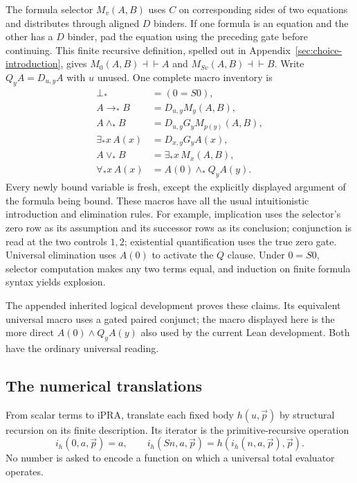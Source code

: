 \documentclass[11pt,letterpaper]{article}
\theoremstyle{definition}\newtheorem{definition}[theorem]{Definition}
\theoremstyle{remark}\newtheorem{remark}[theorem]{Remark}
\begin{document}
The formula selector $M_v(A,B)$ uses $C$ on corresponding sides of two
equations and distributes through aligned $D$ binders. If one formula
is an equation and the other has a $D$ binder, pad the equation using
the preceding gate before continuing. This finite recursive definition,
spelled out in Appendix~\ref{sec:choice-introduction}, gives
$M_0(A,B)\dashv\vdash A$ and $M_{Sv}(A,B)\dashv\vdash B$.
Write $Q_yA=D_{u,y}A$ with $u$ unused. One complete macro inventory is
\[
\begin{aligned}
 \bot_*&=(0=S0),\\
 A\to_*B&=D_{u,y}M_y(A,B),\\
 A\wedge_*B&=D_{u,y}G_y M_{p(y)}(A,B),\\
 \exists_*x\,A(x)&=D_{x,y}G_yA(x),\\
 A\vee_*B&=\exists_*x\,M_x(A,B),\\
 \forall_*x\,A(x)&=A(0)\wedge_* Q_y A(y).
\end{aligned}
\]
Every newly bound variable is fresh, except the explicitly displayed
argument of the formula being bound. These macros have all the usual
intuitionistic introduction and elimination rules. For example,
implication uses the selector's zero row as its assumption and its
successor rows as its conclusion; conjunction is read at the two controls
$1,2$; existential quantification uses the true zero gate. Universal
elimination uses $A(0)$ to activate the $Q$ clause. Under $0=S0$,
selector computation makes any two terms equal, and induction on finite
formula syntax yields explosion.

The appended inherited logical development proves these claims. Its
equivalent universal macro uses a gated paired conjunct; the macro displayed
here is the more direct $A(0)\wedge Q_yA(y)$ also used by the current
Lean development. Both have the ordinary universal reading.

\subsection{The numerical translations}

From scalar terms to iPRA, translate each fixed body $h(u,\vec p)$ by
structural recursion on its finite description. Its iterator is the
primitive-recursive operation
\[
 i_h(0,a,\vec p)=a,\qquad
 i_h(Sn,a,\vec p)=h(i_h(n,a,\vec p),\vec p).
\]
No number is asked to encode a function on which a universal total
evaluator operates.
\end{document}
